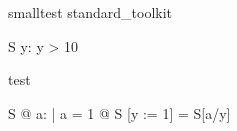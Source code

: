 \begin{zsection}
\SECTION smalltest \parents standard\_toolkit
\end{zsection}

\begin{schema}{S}
   y: \nat
\where
   y > 10
\end{schema}

\begin{theorem}{test}

\forall S @ \exists a: \nat | a = 1 @ \theta S [y := 1] = \theta S[a/y]
\end{theorem}
